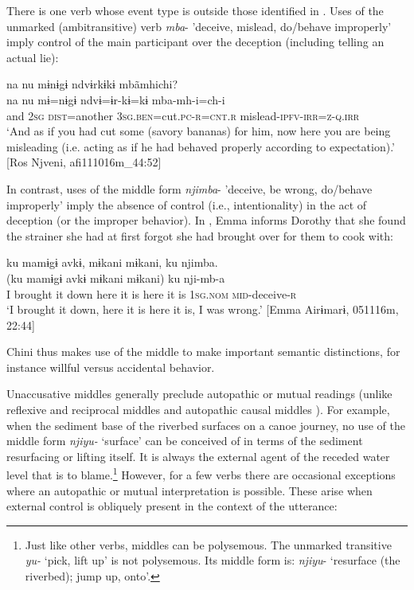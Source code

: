 \documentclass[output=paper]{langscibook}
\begin{document}
There is one verb whose event type is outside those identified in . Uses of the unmarked (ambitransitive) verb \textit{mba}- 'deceive, mislead, do/behave improperly' imply control of the main participant over the deception (including telling an actual lie):

\ea\label{ex:brooks:28}
\glll na  nu   mɨnɨgɨ  ndvɨrkɨkɨ   mbãmhichi?\\
 na  nu   mɨ=nɨgɨ ndvɨ=ɨr-kɨ=kɨ   mba-mh-i=ch-i\\
 and  \textsc{2sg}  \textsc{dist}=another  \textsc{3sg.ben}=cut.\textsc{pc-r}=\textsc{cnt.r}   mislead-\textsc{ipfv-irr=z-q.irr}\\
 \glt `And as if you had cut some (savory bananas) for him, now here you are   being misleading (i.e. acting as if he had behaved properly according to  expectation).' [Ros Njveni, afi111016m\_44:52]
\z


In contrast, uses of the middle form \textit{njimba}- 'deceive, be wrong, do/behave improperly' imply the absence of control (i.e., intentionality) in the act of deception (or the improper behavior). In , Emma informs Dorothy that she found the strainer she had at first forgot she had brought over for them to cook with:

\ea\label{ex:brooks:29}
\glll ku mamɨgɨ avkɨ, mɨkani mɨkani, ku njimba.\\
 (ku mamɨgɨ avkɨ mɨkani mɨkani)  ku nji-mb-a\\
 I brought it down here it is here it is \textsc{1sg.nom}  \textsc{mid}-deceive-\textsc{r}\\
 \glt `I brought it down, here it is here it is, I was wrong.'
 [Emma Airɨmarɨ, 051116m, 22:44]
\z


Chini thus makes use of the middle to make important semantic distinctions, for instance willful versus accidental behavior.

 Unaccusative middles generally preclude autopathic or mutual readings (unlike reflexive and reciprocal middles  and autopathic causal middles ). For example, when the sediment base of the riverbed surfaces on a canoe journey, no use of the middle form \textit{njiyu-} ‘surface’ can be conceived of in terms of the sediment resurfacing or lifting itself. It is always the external agent of the receded water level that is to blame.\footnote{Just like other verbs, middles can be polysemous. The unmarked transitive \textit{yu-} ‘pick, lift up’ is not polysemous. Its middle form is: \textit{njiyu}- ‘resurface (the riverbed); jump up, onto’.} However, for a few verbs there are occasional exceptions where an autopathic  or mutual  interpretation is possible. These arise when external control is obliquely present in the context of the utterance:
\end{document}

